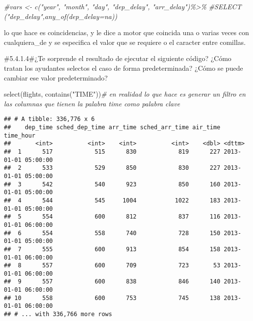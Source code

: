 \documentclass[
]{article}
\newenvironment{Shaded}{\begin{snugshade}}{\end{snugshade}}
\newcommand{\CommentTok}[1]{\textcolor[rgb]{0.56,0.35,0.01}{\textit{#1}}}
\newcommand{\FunctionTok}[1]{\textcolor[rgb]{0.00,0.00,0.00}{#1}}
\newcommand{\NormalTok}[1]{#1}
\newcommand{\StringTok}[1]{\textcolor[rgb]{0.31,0.60,0.02}{#1}}
\begin{document}
\begin{Shaded}
\begin{Highlighting}[]
\CommentTok{\#vars \textless{}{-} c("year", "month", "day", "dep\_delay", "arr\_delay")\%\textgreater{}\%}
\CommentTok{\#SELECT ("dep\_delay",any\_of(dep\_delay=\textquotesingle{}na\textquotesingle{}))}
\end{Highlighting}
\end{Shaded}

lo que hace es coincidencias, y le dice a motor que coincida una o
varias veces con cualquiera\_de y se especifica el valor que se requiere
o el caracter entre comillas.

\#5.4.1.4\#¿Te sorprende el resultado de ejecutar el siguiente código?
¿Cómo tratan los ayudantes selectos el caso de forma predeterminada?
¿Cómo se puede cambiar ese valor predeterminado?

\begin{Shaded}
\begin{Highlighting}[]
\FunctionTok{select}\NormalTok{(flights, }\FunctionTok{contains}\NormalTok{(}\StringTok{"TIME"}\NormalTok{))}\CommentTok{\# en realidad lo que hace es generar un filtro en las columnas que tienen la palabra time como palabra clave}
\end{Highlighting}
\end{Shaded}

\begin{verbatim}
## # A tibble: 336,776 x 6
##    dep_time sched_dep_time arr_time sched_arr_time air_time time_hour          
##       <int>          <int>    <int>          <int>    <dbl> <dttm>             
##  1      517            515      830            819      227 2013-01-01 05:00:00
##  2      533            529      850            830      227 2013-01-01 05:00:00
##  3      542            540      923            850      160 2013-01-01 05:00:00
##  4      544            545     1004           1022      183 2013-01-01 05:00:00
##  5      554            600      812            837      116 2013-01-01 06:00:00
##  6      554            558      740            728      150 2013-01-01 05:00:00
##  7      555            600      913            854      158 2013-01-01 06:00:00
##  8      557            600      709            723       53 2013-01-01 06:00:00
##  9      557            600      838            846      140 2013-01-01 06:00:00
## 10      558            600      753            745      138 2013-01-01 06:00:00
## # ... with 336,766 more rows
\end{verbatim}
\end{document}
